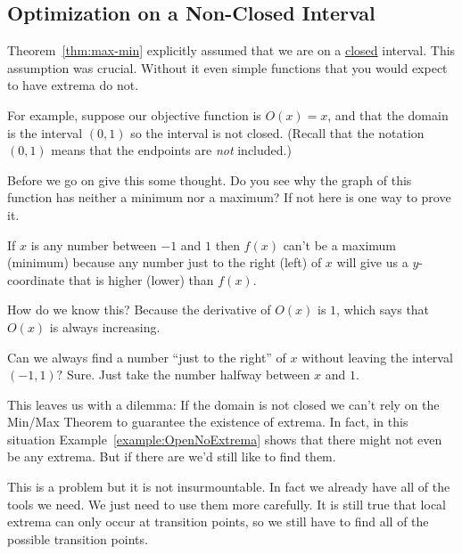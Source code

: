 \subsection{Optimization on a Non-Closed Interval}
\label{sec:optim-non-clos}

Theorem~\ref{thm:max-min} explicitly assumed that we are on a
\underline{closed} interval. This assumption was crucial. Without it
even simple functions that you would expect to have extrema do not. 
\begin{myexample}
\label{example:OpenNoExtrema}
  For example, suppose our objective function is $O(x)=x$, and that
  the domain is the interval $(0,1)$ so the interval is not
  closed. (Recall that the notation $(0,1)$ means that the endpoints
  are \emph{not} included.)

  Before we go on give this some thought. Do you see why the graph of
  this function has neither a minimum nor a maximum?
  If not here is one way to prove it.

  \begin{myproof}
    If $x$ is any number between $-1$ and $1$ then $f(x)$ can't be a
    maximum (minimum) because any number just to the right (left) of $x$
    will give us a $y$-coordinate that is higher (lower) than $f(x)$.

    How do we know this? Because the derivative of $O(x)$ is $1$, which
    says that $O(x)$ is always increasing.

    Can we always find a number ``just to the right'' of $x$ without
    leaving the interval $(-1,1)?$ Sure. Just take the number halfway
    between $x$ and $1.$
  \end{myproof}
\end{myexample}

This leaves us with a dilemma: If the domain is not closed we can't
rely on the Min/Max Theorem to guarantee the existence of extrema. In
fact, in this situation Example~\ref{example:OpenNoExtrema} shows that
there might not even be any extrema. But if there are we'd still like
to find them. 

This is a problem but it is not insurmountable. In fact we already
have all of the tools we need. We just need to use them more
carefully. It is still true that local extrema can only occur at
transition points, so we still have to find all of the possible
transition points.

